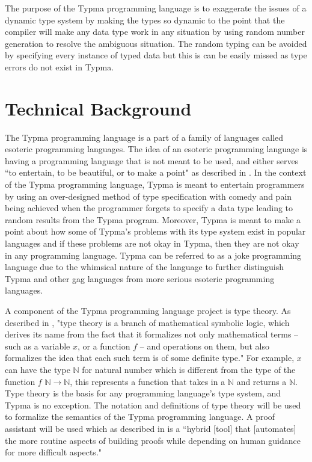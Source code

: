 \documentclass[10pt,twocolumn]{article}
\begin{document}
The purpose of the Typma programming language is to exaggerate the issues of a dynamic type system by making the types so dynamic to the point that the compiler will make any data type work in any situation by using random number generation to resolve the ambiguous situation. The random typing can be avoided by specifying every instance of typed data but this is can be easily missed as type errors do not exist in Typma.

\section{Technical Background}

The Typma programming language is a part of a family of languages called esoteric programming languages. The idea of an esoteric programming language is having a programming language that is not meant to be used, and either serves ``to
entertain, to be beautiful, or to make a point" as described in \textcite{Morr2014Esoteric}. In the context of the Typma programming language, Typma is meant to entertain programmers by using an over-designed method of type specification with comedy and pain being achieved when the programmer forgets to specify a data type leading to random results from the Typma program. Moreover, Typma is meant to make a point about how some of Typma's problems with its type system exist in popular languages and if these problems are not okay in Typma, then they are not okay in any programming language. Typma can be referred to as a joke programming language due to the whimsical nature of the language to further distinguish Typma and other gag languages from more serious esoteric programming languages.

A component of the Typma programming language project is type theory. As described in \textcite{typetheory}, "type theory is a branch of mathematical symbolic logic, which derives its name from the fact that it formalizes not only mathematical terms – such as a variable $x$, or a function $f$ – and operations on them, but also formalizes the idea that each such term is of some definite type." For example, $x$ can have the type $\mathbb{N}$ for natural number which is different from the type of the function $f$ $\mathbb{N} \rightarrow \mathbb{N}$, this represents a function that takes in a $\mathbb{N}$ and returns a $\mathbb{N}$. Type theory is the basis for any programming language's type system, and Typma is no exception. The notation and definitions of type theory will be used to formalize the semantics of the Typma programming language. A proof assistant will be used which as described in \textcite{Pierce2021Software} is a ``hybrid [tool] that [automates] the more routine aspects of building proofs while depending on human guidance for more difficult aspects."
\end{document}
